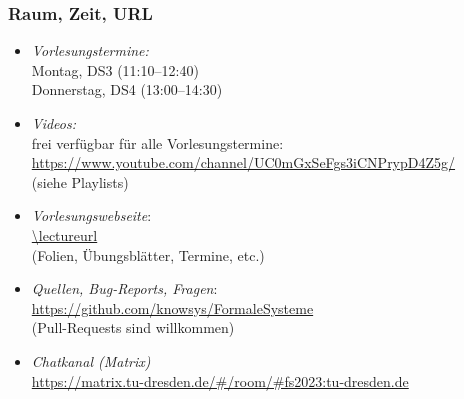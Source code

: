 \documentclass[aspectratio=1610,onlymath]{beamer}
\begin{document}
\maketitle



% 
% 

\begin{frame}\frametitle{Raum, Zeit, URL}

\begin{itemize}
\item \emph{Vorlesungstermine:}\\
	Montag, DS3 (11:10--12:40)\\
	Donnerstag, DS4 (13:00--14:30)
\item \emph{Videos:}\\
	frei verfügbar für alle Vorlesungstermine:\\
	\url{https://www.youtube.com/channel/UC0mGxSeFgs3iCNPrypD4Z5g/}\\
	(siehe Playlists)
\item \emph{Vorlesungswebseite}:\\[.5ex]
	\url{\lectureurl}\\[0.5ex]
	{\footnotesize(Folien, Übungsblätter, Termine, etc.)}
\item \emph{Quellen, Bug-Reports, Fragen}:\\[.5ex]
	\url{https://github.com/knowsys/FormaleSysteme}\\[.5ex]
	{\footnotesize(Pull-Requests sind willkommen)}
\item \emph{Chatkanal (Matrix)}\\[.5ex]
	\url{https://matrix.tu-dresden.de/\#/room/\#fs2023:tu-dresden.de}
\end{itemize}

\end{frame}
\end{document}
